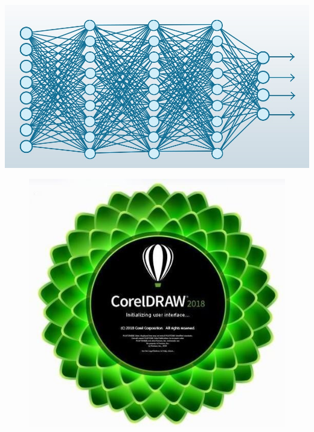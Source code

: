 \documentclass{beamer}
\begin{document}
\begin{frame}
\includegraphics[scale=0.15]{deepLearning}
\begin{figure}
\centering
\includegraphics[scale=0.11]{corelDraw}

\end{figure}
\end{frame}
\end{document}

